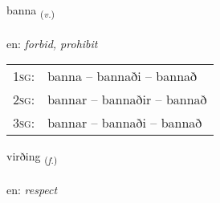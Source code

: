 \documentclass[frontgrid, backgrid]{flacards}\usepackage[]{graphicx}\usepackage[]{color}
\begin{document}
\renewcommand{\blhead}{\vskip5pt {\small\bfseries\footnotesize Sagnorð | Verb }}
\renewcommand{\bcfoot}{\vskip5pt \hspace{2pt}{\small\bfseries\footnotesize 2K}}


{banna \small{\textsubscript{(\textit{v.})}} \\[1ex] %
\textphonetic{[pana]} \\
en: \emph{forbid, prohibit} \\  [2ex]
\renewcommand*{\arraystretch}{0.8}
\begin{tabular}{p{1cm}l}
\textsc{1sg}: & banna -- bannaði -- bannað \\ 
\textsc{2sg}: & bannar -- bannaðir -- bannað \\ 
\textsc{3sg}: & bannar -- bannaði -- bannað \\ 
\end{tabular}
}

\renewcommand{\flhead}{\vskip5pt \fboxsep=0pt {\small\bfseries\footnotesize Nafnorð | Noun}}
\renewcommand{\fcfoot}{\vskip5pt \fboxsep=0pt \hspace{2pt}{\small\bfseries\footnotesize 2K}}

\renewcommand{\blhead}{\vskip5pt {\small\bfseries\footnotesize Nafnorð | Noun }}
\renewcommand{\bcfoot}{\vskip5pt \hspace{2pt}{\small\bfseries\footnotesize 2K}}


{virðing \small{\textsubscript{(\textit{f.})}} \\[1ex] %
\textphonetic{[vɪrðiŋk]} \\
en: \emph{respect} \\  [2ex]
\renewcommand*{\arraystretch}{0.8}
}

\renewcommand{\flhead}{\vskip5pt \fboxsep=0pt {\small\bfseries\footnotesize Nafnorð | Noun}}
\renewcommand{\fcfoot}{\vskip5pt \fboxsep=0pt \hspace{2pt}{\small\bfseries\footnotesize 2K}}
\end{document}
